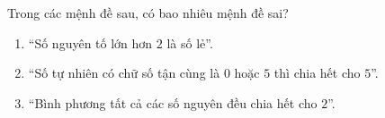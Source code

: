 \begin{ex}
Trong các mệnh đề sau, có bao nhiêu mệnh đề sai?
\begin{enumerate}[label=\alph*)]
\item ``Số nguyên tố lớn hơn $2$ là số lẻ''.
\item ``Số tự nhiên có chữ số tận cùng là $0$ hoặc $5$ thì chia hết cho $5$''.
\item ``Bình phương tất cả các số nguyên đều chia hết cho $2$''.
\end{enumerate}
\end{ex}

